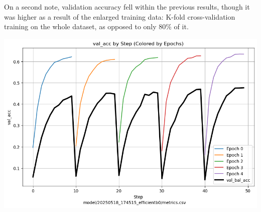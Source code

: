 \documentclass[11pt]{article}
\begin{document}
\vspace{1em}

\begin{minipage}{0.6\linewidth}
  On a second note, validation accuracy fell within the previous results, though it was higher as a result of the enlarged training data: K-fold cross-validation training on the whole dataset, as opposed to only 80\% of it.
\end{minipage}
\hfill
\begin{minipage}{0.35\linewidth}
  \includegraphics[width=\linewidth]{img/efficientb_acc_kfold.png}
\end{minipage}
\end{document}
